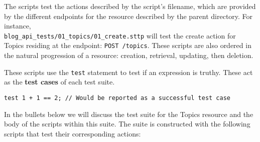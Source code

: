 The scripts test the actions described by the script's filename, which are provided by the different endpoints for the resource described by the parent directory. For instance, \\\verb|blog_api_tests/01_topics/01_create.sttp| will test the create action for Topics residing at the endpoint: \verb|POST /topics|. These scripts are also ordered in the natural progression of a resource: creation, retrieval, updating, then deletion.

These scripts use the \verb|test| statement to test if an expression is truthy. These act as the \textbf{test cases} of each test suite.

\begin{verbatim}
test 1 + 1 == 2; // Would be reported as a successful test case
\end{verbatim}

In the bullets below we will discuss the test suite for the Topics resource and the body of the scripts within this suite. The suite is constructed with the following scripts that test their corresponding actions:

